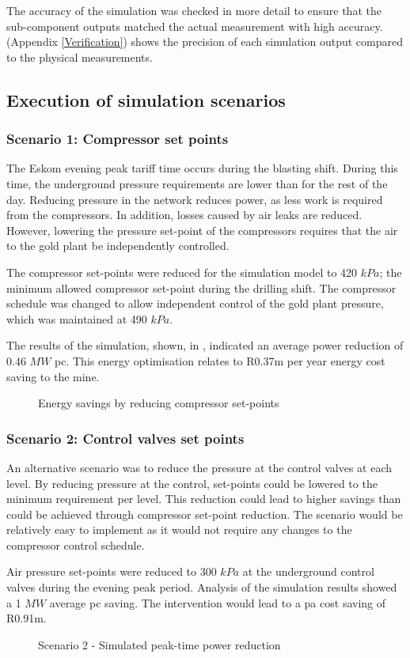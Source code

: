 \par
The accuracy of the simulation was checked in more detail to ensure that the sub-component outputs matched the actual measurement with high accuracy. (Appendix \ref{Verification}) shows the precision of each simulation output compared to the physical measurements.
\subsection{Execution of simulation scenarios}
\subsubsection{Scenario 1: Compressor set points}
The Eskom evening peak tariff time occurs during the blasting shift. During this time, the underground pressure requirements are lower than for the rest of the day. Reducing pressure in the network reduces power, as less work is required from the compressors. In addition, losses caused by air leaks are reduced. However, lowering the pressure  set-point of the compressors requires that the air to the gold plant be independently controlled. 
\par 
The compressor  set-points were reduced for the simulation model to 420 $kPa$; the minimum allowed compressor  set-point during the drilling shift. The compressor schedule was changed to allow independent control of the gold plant pressure, which was maintained at 490 $kPa$. 
\par 
The results of the simulation, shown, in , indicated an average power reduction of 0.46 $MW$ \gls{pc}. This energy optimisation relates to R0.37m per year energy cost saving to the mine.
\clearpage 
\begin{figure}[!htbp]
	\centering
	
	\caption{Energy savings by reducing compressor  set-points}
	\label{fig: CompSetpoints Results Beatrix}
\end{figure}

\subsubsection{Scenario 2: Control valves set points}
An alternative scenario was to reduce the pressure at the control valves at each level. By reducing pressure at the control,  set-points could be lowered to the minimum requirement per level. This reduction could lead to higher savings than could be achieved through compressor set-point reduction. The scenario would be relatively easy to implement as it would not require any changes to the compressor control schedule.
\par 
Air pressure  set-points were reduced to 300 $kPa$ at the underground control valves during the evening peak period. Analysis of the simulation results showed a 1 $MW$ average \gls{pc} saving. The intervention would lead to a \gls{pa} cost saving of R0.91m.
\begin{figure}[h!]
	\centering
	
	\caption{Scenario 2 - Simulated peak-time power reduction}
	\label{fig: Control Valve Results Beatrix}
\end{figure}
